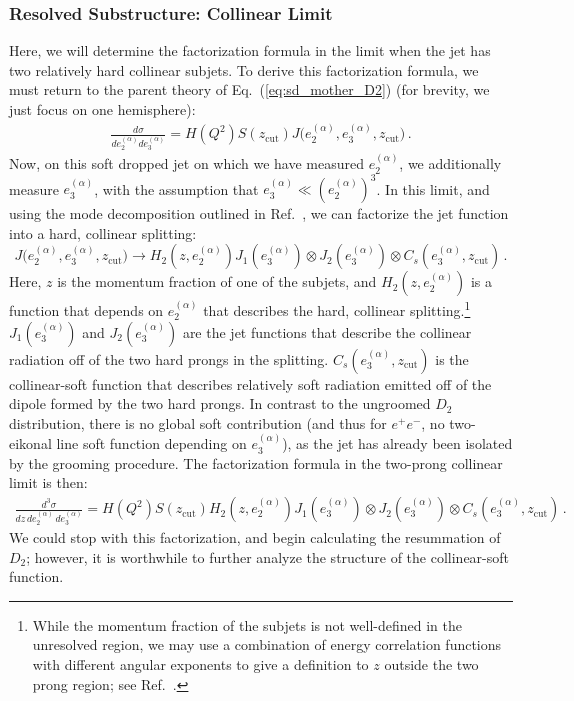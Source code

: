 \documentclass[a4paper,11pt]{article}
\newcommand{\ecf}[2]{e_{#1}^{(#2)}}
\def\zcut{z_{\text{cut}}}
\DeclareRobustCommand{\Eq}[1]{Eq.~(\ref{#1})}
\DeclareRobustCommand{\Ref}[1]{Ref.~\cite{#1}}
\begin{document}
\subsubsection{Resolved Substructure: Collinear Limit}\label{sec:resolved}



Here, we will determine the factorization formula in the limit when the jet has two relatively hard collinear subjets.  To derive this factorization formula, we must return to the parent theory of \Eq{eq:sd_mother_D2} (for brevity, we just focus on one hemisphere):
\begin{align}
\frac{d\sigma}{d\ecf{2}{\alpha}d\ecf{3}{\alpha} }= H(Q^2) S(\zcut)  J\big(\ecf{2}{\alpha},\ecf{3}{\alpha},\zcut\big) \,.
\end{align}
Now, on this soft dropped jet on which we have measured $\ecf{2}{\alpha}$, we additionally measure $\ecf{3}{\alpha}$, with the assumption that $\ecf{3}{\alpha}\ll (\ecf{2}{\alpha})^3$.  In this limit, and using the mode decomposition outlined in \Ref{Larkoski:2015kga}, we can factorize the jet function into a hard, collinear splitting:
\begin{equation}
J\big(\ecf{2}{\alpha},\ecf{3}{\alpha},\zcut\big) \to H_2(z,\ecf{2}{\alpha})J_1(\ecf{3}{\alpha})\otimes J_2(\ecf{3}{\alpha})\otimes C_s(\ecf{3}{\alpha},\zcut)\,.
\end{equation}
Here, $z$ is the momentum fraction of one of the subjets, and $H_2(z,\ecf{2}{\alpha})$ is a function that depends on $\ecf{2}{\alpha}$ that describes the hard, collinear splitting.\footnote{While the momentum fraction of the subjets is not well-defined in the unresolved region, we may use a combination of energy correlation functions with different angular exponents to give a definition to $z$ outside the two prong region; see \Ref{Larkoski:2015kga}.}  $J_1(\ecf{3}{\alpha})$ and $J_2(\ecf{3}{\alpha})$ are the jet functions that describe the collinear radiation off of the two hard prongs in the splitting.  $C_s(\ecf{3}{\alpha},\zcut)$ is the collinear-soft function that describes relatively soft radiation emitted off of the dipole formed by the two hard prongs. In contrast to the ungroomed $D_2$ distribution, there is no global soft contribution (and thus for $e^+e^-$, no two-eikonal line soft function depending on $\ecf{3}{\alpha}$), as the jet has already been isolated by the grooming procedure. The factorization formula in the two-prong collinear limit is then:
\begin{align}
\frac{d^3\sigma}{dz\, d\ecf{2}{\alpha}\, d\ecf{3}{\alpha} }= H(Q^2) S(\zcut) H_2(z,\ecf{2}{\alpha})J_1(\ecf{3}{\alpha})\otimes J_2(\ecf{3}{\alpha})\otimes C_s(\ecf{3}{\alpha},\zcut) \,.
\end{align}
We could stop with this factorization, and begin calculating the resummation of $D_2$; however, it is worthwhile to further analyze the structure of the collinear-soft function.
\end{document}
